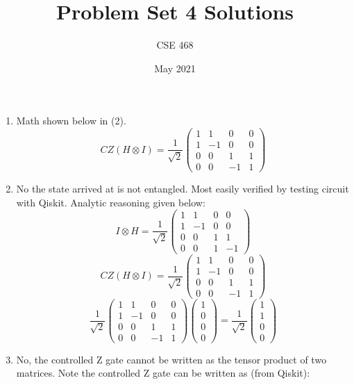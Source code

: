 \documentclass[12pt]{article}
\title{Problem Set 4 Solutions}
\author{CSE 468}
\date{May 2021}
\begin{document}
\maketitle

\begin{enumerate}[font=\bfseries]
    \item Math shown below in (2).
    \[CZ(H \otimes I) = \frac{1}{\sqrt{2}}
    \begin{pmatrix}
    1 & 1 & 0 & 0 \\
    1 & -1 & 0 & 0 \\
    0 & 0 & 1 & 1 \\
    0 & 0 & -1 & 1
    \end{pmatrix}
    \]
    \item No the state arrived at is not entangled. Most easily verified by testing circuit with Qiskit. Analytic reasoning given below:
    \[I \otimes H = \frac{1}{\sqrt{2}}\begin{pmatrix}
    1 & 1 & 0 & 0 \\
    1 & -1 & 0 & 0 \\
    0 & 0 & 1 & 1 \\
    0 & 0 & 1 & -1
    \end{pmatrix}\]
    \[CZ(H \otimes I) = \frac{1}{\sqrt{2}}
    \begin{pmatrix}
    1 & 1 & 0 & 0 \\
    1 & -1 & 0 & 0 \\
    0 & 0 & 1 & 1 \\
    0 & 0 & -1 & 1
    \end{pmatrix}
    \]
    \[\frac{1}{\sqrt{2}}
    \begin{pmatrix}
    1 & 1 & 0 & 0 \\
    1 & -1 & 0 & 0 \\
    0 & 0 & 1 & 1 \\
    0 & 0 & -1 & 1
    \end{pmatrix}
    \begin{pmatrix}
    1 \\ 0 \\ 0 \\ 0
    \end{pmatrix}
    =
    \frac{1}{\sqrt{2}}
    \begin{pmatrix}
    1 \\ 1 \\ 0 \\ 0
    \end{pmatrix}
    \]
    \item No, the controlled Z gate cannot be written as the tensor product of two matrices. Note the controlled Z gate can be written as (from Qiskit):

\end{enumerate}
\end{document}
